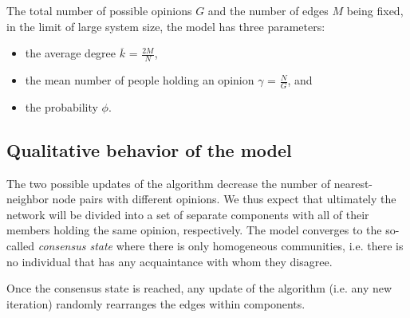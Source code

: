 \documentclass[11pt]{article}
\begin{document}
The total number of possible opinions $G$ and the number of edges $M$ being fixed, in the limit of large system size, the model has three parameters:
\begin{itemize}
    \item the average degree $\overline{k}$ = $\frac{2M}{N}$,
    \item the mean number of people holding an opinion $\gamma$ = $\frac{N}{G}$, and
    \item the probability $\phi$.
\end{itemize}
\subsection{Qualitative behavior of the model}
\label{sec:qul_behaviour}
The two possible updates of the algorithm decrease the number of nearest-neighbor node pairs with different opinions. We thus expect that ultimately the network will be divided into a set of separate components with all of their members holding the same opinion, respectively. The model converges to the so-called \textit{consensus state} where there is only homogeneous communities, i.e. there is no individual that has any acquaintance with whom they disagree.

Once the consensus state is reached, any update of the algorithm (i.e. any new iteration) randomly rearranges the edges within components.
\end{document}
